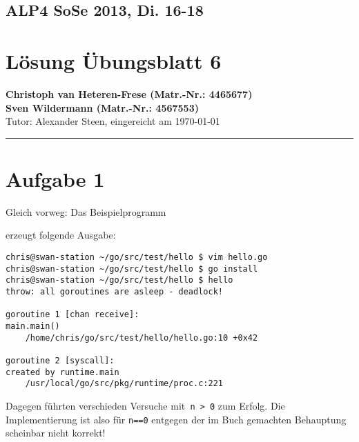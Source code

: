 \documentclass[11pt,a4paper,DIV=10,]{scrartcl}
\begin{document}
\subsection*{ALP4 SoSe 2013, Di. 16-18}
\section*{Lösung Übungsblatt 6}
\textbf{Christoph van Heteren-Frese (Matr.-Nr.: 4465677)} \\ \textbf{Sven Wildermann (Matr.-Nr.: 4567553)}\\
Tutor: Alexander Steen, eingereicht am \today\\
\hrule

\section*{Aufgabe 1}
Gleich vorweg: Das Beispielprogramm 
 
erzeugt folgende Ausgabe:
 \begin{lstlisting}[numbers=none]
chris@swan-station ~/go/src/test/hello $ vim hello.go 
chris@swan-station ~/go/src/test/hello $ go install
chris@swan-station ~/go/src/test/hello $ hello
throw: all goroutines are asleep - deadlock!

goroutine 1 [chan receive]:
main.main()
	/home/chris/go/src/test/hello/hello.go:10 +0x42

goroutine 2 [syscall]:
created by runtime.main
	/usr/local/go/src/pkg/runtime/proc.c:221
 \end{lstlisting}
Dagegen führten verschieden Versuche mit\texttt{ n > 0} zum Erfolg. Die Implementierung ist also für \texttt{n==0} entgegen der im Buch gemachten Behauptung scheinbar nicht korrekt! 
\end{document}
